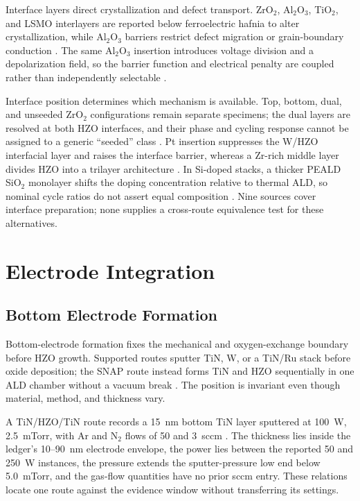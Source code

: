 \documentclass[11pt,a4paper]{report}
\begin{document}
Interface layers direct crystallization and defect transport. ZrO$_2$, Al$_2$O$_3$, TiO$_2$, and LSMO interlayers are reported below ferroelectric hafnia to alter crystallization, while Al$_2$O$_3$ barriers restrict defect migration or grain-boundary conduction \cite{silva2023road,liao2023postmoore}. The same Al$_2$O$_3$ insertion introduces voltage division and a depolarization field, so the barrier function and electrical penalty are coupled rather than independently selectable \cite{silva2023road,liao2023postmoore}.

Interface position determines which mechanism is available. Top, bottom, dual, and unseeded ZrO$_2$ configurations remain separate specimens; the dual layers are resolved at both HZO interfaces, and their phase and cycling response cannot be assigned to a generic ``seeded'' class \cite{song2023seed}. Pt insertion suppresses the W/HZO interfacial layer and raises the interface barrier, whereas a Zr-rich middle layer divides HZO into a trilayer architecture \cite{kashir2021wake,liu2025zrrich}. In Si-doped stacks, a thicker PEALD SiO$_2$ monolayer shifts the doping concentration relative to thermal ALD, so nominal cycle ratios do not assert equal composition \cite{neuber2022peald}. Nine sources cover interface preparation; none supplies a cross-route equivalence test for these alternatives.

\section{Electrode Integration}
\label{sec:ald-electrode-integration}
\subsection{Bottom Electrode Formation}
\label{sec:ald-bottom-electrode}

Bottom-electrode formation fixes the mechanical and oxygen-exchange boundary before HZO growth. Supported routes sputter TiN, W, or a TiN/Ru stack before oxide deposition; the SNAP route instead forms TiN and HZO sequentially in one ALD chamber without a vacuum break \cite{silva2023road,choi2022chamber,zhang2015inductive,kaatranen2026unif}. The position is invariant even though material, method, and thickness vary.

A TiN/HZO/TiN route records a 15~nm bottom TiN layer sputtered at 100~W, 2.5~mTorr, with Ar and N$_2$ flows of 50 and 3~sccm \cite{tsai2022stress}. The thickness lies inside the ledger's 10--90~nm electrode envelope, the power lies between the reported 50 and 250~W instances, the pressure extends the sputter-pressure low end below 5.0~mTorr, and the gas-flow quantities have no prior sccm entry. These relations locate one route against the evidence window without transferring its settings.
\end{document}
